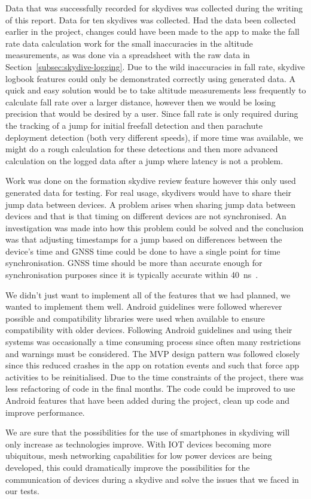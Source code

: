 Data that was successfully recorded for skydives was collected during the writing of this report. Data for ten skydives was collected. Had the data been collected earlier in the project, changes could have been made to the app to make the fall rate data calculation work for the small inaccuracies in the altitude measurements, as was done via a spreadsheet with the raw data in Section~\ref{subsec:skydive-logging}. Due to the wild inaccuracies in fall rate, skydive logbook features could only be demonstrated correctly using generated data. A quick and easy solution would be to take altitude measurements less frequently to calculate fall rate over a larger distance, however then we would be losing precision that would be desired by a user.
Since fall rate is only required during the tracking of a jump for initial freefall detection and then parachute deployment detection (both very different speeds), if more time was available, we might do a rough calculation for these detections and then more advanced calculation on the logged data after a jump where latency is not a problem.

Work was done on the formation skydive review feature however this only used generated data for testing. For real usage, skydivers would have to share their jump data between devices. A problem arises when sharing jump data between devices and that is that timing on different devices are not synchronised. An investigation was made into how this problem could be solved and the conclusion was that adjusting timestamps for a jump based on differences between the device's time and GNSS time could be done to have a single point for time synchronisation. GNSS time should be more than accurate enough for synchronisation purposes since it is typically accurate within \SI{40}{\nano\second}~\cite{_gps_????}.

We didn't just want to implement all of the features that we had planned, we wanted to implement them well. Android guidelines were followed wherever possible and compatibility libraries were used when available to ensure compatibility with older devices. Following Android guidelines and using their systems was occasionally a time consuming process since often many restrictions and warnings must be considered. The MVP design pattern was followed closely since this reduced crashes in the app on rotation events and such that force app activities to be reinitialised. Due to the time constraints of the project, there was less refactoring of code in the final months. The code could be improved to use Android features that have been added during the project, clean up code and improve performance.

We are sure that the possibilities for the use of smartphones in skydiving will only increase as technologies improve. With IOT devices becoming more ubiquitous, mesh networking capabilities for low power devices are being developed, this could dramatically improve the possibilities for the communication of devices during a skydive and solve the issues that we faced in our tests.
